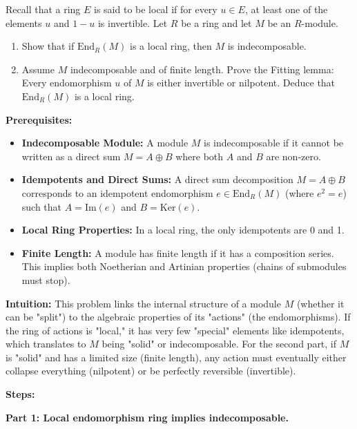 \begin{exercise}
\label{algebra:2018:6}
Recall that a ring $E$ is said to be local if for every $u \in E$, at least one of the elements $u$ and $1 - u$ is invertible. Let $R$ be a ring and let $M$ be an $R$-module.
\begin{enumerate}
    \item Show that if $\mathrm{End}_R(M)$ is a local ring, then $M$ is indecomposable.
    \item Assume $M$ indecomposable and of finite length. Prove the Fitting lemma: Every endomorphism $u$ of $M$ is either invertible or nilpotent. Deduce that $\mathrm{End}_R(M)$ is a local ring.
\end{enumerate}
\end{exercise}
\begin{solution}
\textbf{Prerequisites:}
\begin{itemize}
    \item \textbf{Indecomposable Module:} A module $M$ is indecomposable if it cannot be written as a direct sum $M = A \oplus B$ where both $A$ and $B$ are non-zero.
    \item \textbf{Idempotents and Direct Sums:} A direct sum decomposition $M = A \oplus B$ corresponds to an idempotent endomorphism $e \in \mathrm{End}_R(M)$ (where $e^2 = e$) such that $A = \mathrm{Im}(e)$ and $B = \mathrm{Ker}(e)$.
    \item \textbf{Local Ring Properties:} In a local ring, the only idempotents are 0 and 1.
    \item \textbf{Finite Length:} A module has finite length if it has a composition series. This implies both Noetherian and Artinian properties (chains of submodules must stop).
\end{itemize}

\bigskip

\textbf{Intuition:}
This problem links the internal structure of a module $M$ (whether it can be "split") to the algebraic properties of its "actions" (the endomorphisms). If the ring of actions is "local," it has very few "special" elements like idempotents, which translates to $M$ being "solid" or indecomposable. For the second part, if $M$ is "solid" and has a limited size (finite length), any action must eventually either collapse everything (nilpotent) or be perfectly reversible (invertible).

\bigskip

\textbf{Steps:}

\textbf{Part 1: Local endomorphism ring implies indecomposable.}


\end{solution}
